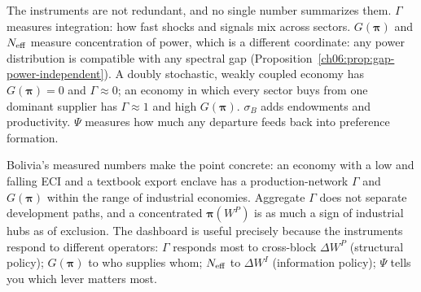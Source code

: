 \documentclass[../structural_economics_book.tex]{subfiles}
\begin{document}
\begin{keyinsight}
The instruments are not redundant, and no single number summarizes them. $\Gamma$ measures integration: how fast shocks and signals mix across sectors. $G(\boldsymbol{\pi})$ and $N_{\text{eff}}$ measure concentration of power, which is a different coordinate: any power distribution is compatible with any spectral gap (Proposition~\ref{ch06:prop:gap-power-independent}). A doubly stochastic, weakly coupled economy has $G(\boldsymbol{\pi}) = 0$ and $\Gamma \approx 0$; an economy in which every sector buys from one dominant supplier has $\Gamma \approx 1$ and high $G(\boldsymbol{\pi})$. $\sigma_B$ adds endowments and productivity. $\Psi$ measures how much any departure feeds back into preference formation.

Bolivia's measured numbers make the point concrete: an economy with a low and falling ECI and a textbook export enclave has a production-network $\Gamma$ and $G(\boldsymbol{\pi})$ within the range of industrial economies. Aggregate $\Gamma$ does not separate development paths, and a concentrated $\boldsymbol{\pi}(W^P)$ is as much a sign of industrial hubs as of exclusion. The dashboard is useful precisely because the instruments respond to different operators: $\Gamma$ responds most to cross-block $\Delta W^P$ (structural policy); $G(\boldsymbol{\pi})$ to who supplies whom; $N_{\text{eff}}$ to $\Delta W^I$ (information policy); $\Psi$ tells you which lever matters most.
\end{keyinsight}
\end{document}
